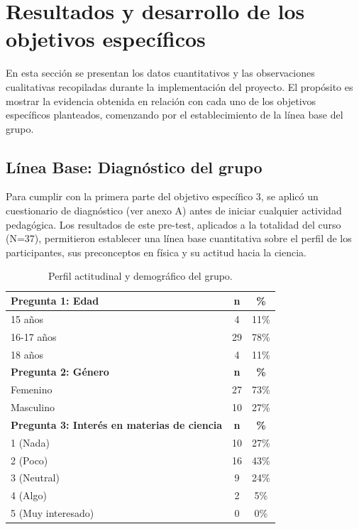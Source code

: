 \documentclass[10pt,a4paper]{article}
\begin{document}
\section{Resultados y desarrollo de los objetivos específicos}

En esta sección se presentan los datos cuantitativos y las observaciones cualitativas recopiladas durante la implementación del proyecto. El propósito es mostrar la evidencia obtenida en relación con cada uno de los objetivos específicos planteados, comenzando por el establecimiento de la línea base del grupo.

\subsection{Línea Base: Diagnóstico del grupo}

Para cumplir con la primera parte del objetivo específico 3, se aplicó un cuestionario de diagnóstico (ver anexo A) antes de iniciar cualquier actividad pedagógica. Los resultados de este pre-test, aplicados a la totalidad del curso (N=37), permitieron establecer una línea base cuantitativa sobre el perfil de los participantes, sus preconceptos en física y su actitud hacia la ciencia. %

\begin{table}[h!]
\centering
\caption{Perfil actitudinal y demográfico del grupo.}
\label{tab:pre_perfil}
\begin{tabular}{|l|c|c|}
\hline
\textbf{Pregunta 1: Edad} & \textbf{n} & \textbf{\%} \\
\hline
15 años & 4 & 11\% \\
16-17 años & 29 & 78\% \\
18 años & 4 & 11\% \\
\hline
\textbf{Pregunta 2: Género} & \textbf{n} & \textbf{\%} \\
\hline
Femenino & 27 & 73\% \\
Masculino & 10 & 27\% \\
\hline
\hline
\textbf{Pregunta 3: Interés en materias de ciencia} & \textbf{n} & \textbf{\%} \\
\hline
1 (Nada) & 10 & 27\% \\
2 (Poco) & 16 & 43\% \\
3 (Neutral) & 9 & 24\% \\
4 (Algo) & 2 & 5\% \\
5 (Muy interesado) & 0 & 0\% \\
\hline
\end{tabular}
\end{table}
\end{document}
